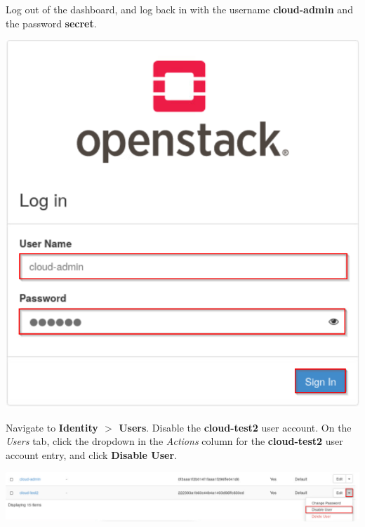 \documentclass[letterpaper, 12pt]{article}
\begin{document}
\begin{enumerate}
    \begin{labstep}
        Log out of the dashboard, and log back in with the username \textbf{cloud-admin} and the password \textbf{secret}.

        \begin{center}
            \includegraphics[scale=0.5]{images/part3/step12.png}
        \end{center}
    \end{labstep}

    \begin{labstep}
        Navigate to \textbf{Identity $>$ Users}.
        Disable the \textbf{cloud-test2} user account.
        On the \textit{Users} tab, click the dropdown in the \textit{Actions} column for the \textbf{cloud-test2} user account entry, and click \textbf{Disable User}.

        \begin{center}
            \includegraphics[width=\linewidth]{images/part3/step13.png}
        \end{center}
    \end{labstep}


\end{enumerate}
\end{document}
